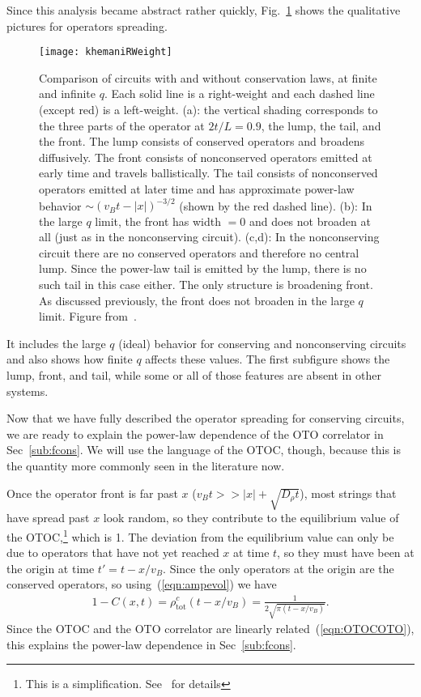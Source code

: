 \documentclass[a4paper,12pt]{article}
\renewcommand{\th}[1]{\frac{1}{#1}}
\newcommand{\abs}[1]{\left| #1 \right|}
\newcommand{\tot}{\text{tot}}
\begin{document}
Since this analysis became abstract rather quickly, Fig.~\ref{fig:khemaniRWeight} shows the qualitative pictures for operators spreading.
\begin{figure}
	\centering
	\texttt{[image: khemaniRWeight]}
	\caption{Comparison of circuits with and without conservation laws, at finite and infinite $q$. Each solid line is a right-weight and each dashed line (except red) is a left-weight. (a): the vertical shading corresponds to the three parts of the operator at $2t/L=0.9$, the lump, the tail, and the front. The lump consists of conserved operators and broadens diffusively. The front consists of nonconserved operators emitted at early time and travels ballistically. The tail consists of nonconserved operators emitted at later time and has approximate power-law behavior $\sim(v_Bt-\abs{x})^{-3/2}$ (shown by the red dashed line). (b): In the large $q$ limit, the front has width $=0$ and does not broaden at all (just as in the nonconserving circuit). (c,d): In the nonconserving circuit there are no conserved operators and therefore no central lump. Since the power-law tail is emitted by the lump, there is no such tail in this case either. The only structure is broadening front. As discussed previously, the front does not broaden in the large $q$ limit. Figure from~\cite{KhemaniOpSp}.}
	\label{fig:khemaniRWeight}
\end{figure}
It includes the large $q$ (ideal) behavior for conserving and nonconserving circuits and also shows how finite $q$ affects these values. The first subfigure shows the lump, front, and tail, while some or all of those features are absent in other systems.

Now that we have fully described the operator spreading for conserving circuits, we are ready to explain the power-law dependence of the OTO correlator in Sec~\ref{sub:fcons}. We will use the language of the OTOC, though, because this is the quantity more commonly seen in the literature now.

Once the operator front is far past $x$ ($v_Bt>>\abs{x}+\sqrt{D_\rho t}$), most strings that have spread past $x$ look random, so they contribute to the equilibrium value of the OTOC,\footnote{This is a simplification. See~\cite{KhemaniOpSp} for details} which is 1. The deviation from the equilibrium value can only be due to operators that have not yet reached $x$ at time $t$, so they must have been at the origin at time $t'=t-x/v_B$. Since the only operators at the origin are the conserved operators, so using~(\ref{eqn:ampevol}) we have
\begin{align}
1-C(x,t) = \rho^c_\tot(t-x/v_B) = \th{2\sqrt{\pi(t-x/v_B)}}.
\end{align}
Since the OTOC and the OTO correlator are linearly related~(\ref{eqn:OTOCOTO}), this explains the power-law dependence in Sec~\ref{sub:fcons}.
\end{document}
